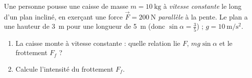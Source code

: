 \documentclass[11pt,a4paper]{article}
\newcommand{\vv}[1]{\vec{#1}}\newcommand{\ds}{\displaystyle}
\begin{document}
\begin{exo}
Une personne pousse une caisse de masse $m=\qty{10}{\kilogram}$ à \emph{vitesse constante} le long d'un
plan incliné, en exerçant une force $\vv F=\qty{200}{\newton}$ \emph{parallèle} à la pente. Le plan a une
hauteur de \qty{3}{\metre} pour une longueur de \qty{5}{\metre} (donc $\sin\alpha=\tfrac{3}{5}$) ;
$g=\qty{10}{\metre\per\second\squared}$.
\begin{enumerate}[label=\alph*)]
  \item La caisse monte à vitesse constante : quelle relation lie $F$, $mg\sin\alpha$ et le frottement $F_f$ ?
  \item Calcule l'intensité du frottement $F_f$.
\end{enumerate}
\end{exo}
\end{document}
